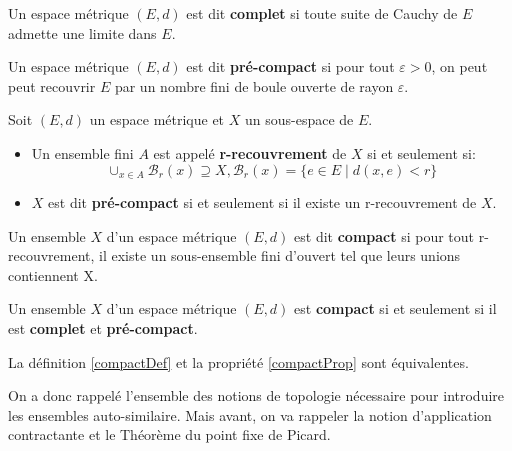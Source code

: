 \documentclass[a4paper, 12pt]{report}
\begin{document}
			\begin{definition}
				Un espace métrique $(E,d)$ est dit \textbf{complet} si toute suite de Cauchy de $E$ admette une limite dans $E$.
				\label{espMetriqueDef}
			\end{definition}
			
			\begin{definition}
				Un espace métrique $(E,d)$ est dit \textbf{pré-compact} si pour tout $\varepsilon >0$, on peut peut recouvrir $E$ par un nombre fini de boule ouverte de rayon $\varepsilon$.
			\end{definition}
			
			\begin{definition}
				Soit $(E,d)$ un espace métrique et $X$ un sous-espace de $E$.
				\begin{itemize}
					\item Un ensemble fini $A$ est appelé \textbf{r-recouvrement} de $X$ si et seulement si:
					\begin{equation*}
						\cup_{x\in A} \mathcal{B}_r(x)\supseteq X,\mathcal{B}_r(x)=\{e\in E\mid d(x,e)<r\}
					\end{equation*}
					\item $X$ est dit \textbf{pré-compact} si et seulement si il existe un r-recouvrement de $X$.
				\end{itemize}
			\end{definition}
			
			\begin{definition}
			\label{compactDef}
				Un ensemble $X$ d'un espace métrique $(E,d)$ est dit \textbf{compact} si pour tout r-recouvrement, il existe un sous-ensemble fini d'ouvert tel que leurs unions contiennent X.
			\end{definition}
			
			\begin{prop}
			\label{compactProp}
				Un ensemble $X$ d'un espace métrique $(E,d)$ est \textbf{compact} si et seulement si il est \textbf{complet} et \textbf{pré-compact}.
			\end{prop}
			
			\begin{remark*}
				La définition \ref{compactDef} et la propriété \ref{compactProp} sont équivalentes.
			\end{remark*}

			

			\hspace{.7 cm} On a donc rappelé l'ensemble des notions de topologie nécessaire pour introduire les ensembles auto-similaire. Mais avant, on va rappeler la notion d'application contractante et le Théorème du point fixe de Picard.
			
\end{document}
